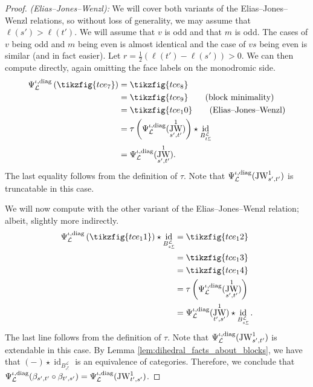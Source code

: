 \documentclass{amsart}
\newcommand{\scrL}{\mathcal{L}}
\DeclareMathOperator{\id}{id}
\DeclareMathOperator{\JW}{JW}
\theoremstyle{definition}
\numberwithin{equation}{subsection}
\begin{document}
\begin{proof}
    \emph{(Elias--Jones--Wenzl): } We will cover both variants of the Elias--Jones--Wenzl relations, so without loss of generality, we may assume that $\ell (s') > \ell (t')$.
    We will assume that $v$ is odd and that $m$ is odd. The cases of $v$ being odd and $m$ being even is almost identical and the case of $vs$ being even is similar (and in fact easier).
    Let $r = \frac{1}{2} (\ell (t') - \ell (s')) > 0$.
    We can then compute directly, again omitting the face labels on the monodromic side.
    \begin{align*}
        \Psi_{\scrL}^{\iota, \textnormal{diag}} \left( \tikzfig{tce_7}\right) &= \tikzfig{tce_8} \\
        &= \tikzfig{tce_9} \tag{block minimality}\\
        &= \tikzfig{tce_10} \tag{Elias--Jones--Wenzl}\\
        &= \tau \left(  \Psi_{\scrL}^{\iota, \textnormal{diag}} (\JW_{s',t'}^1) \right) \star \id_{B_{{}_t \underline{r}}^{\scrL}}  \\
        &= \Psi_{\scrL}^{\iota, \textnormal{diag}} (\JW_{s',t'}^1). 
    \end{align*}
    The last equality follows from the definition of $\tau$. Note that $\Psi_{\scrL}^{\iota, \textnormal{diag}} (\JW_{s',t'}^1)$ is truncatable in this case.

    We will now compute with the other variant of the Elias--Jones--Wenzl relation; albeit, slightly more indirectly.
    \begin{align*}
        \Psi_{\scrL}^{\iota, \textnormal{diag}} \left( \tikzfig{tce_11}\right) \star \id_{B_{{}_s \underline{r}}^{\scrL}} &= \tikzfig{tce_12} \\
        &= \tikzfig{tce_13} \\
        &= \tikzfig{tce_14} \\
        &= \tau \left(  \Psi_{\scrL}^{\iota, \textnormal{diag}} (\JW_{s',t'}^1) \right) \\
        &= \Psi_{\scrL}^{\iota, \textnormal{diag}} (\JW_{t',s'}^1) \star \id_{B_{{}_s \underline{r}}^{\scrL}}. 
    \end{align*}
    The last line follows from the definition of $\tau$. Note that $\Psi_{\scrL}^{\iota, \textnormal{diag}} (\JW_{s',t'}^1)$ is extendable in this case.
    By Lemma \ref{lem:dihedral_facts_about_blocks}, we have that $(-) \star \id_{B_{{}_s \underline{r}}^{\scrL}}$ is an equivalence of categories.
    Therefore, we conclude that $\Psi_{\scrL}^{\iota, \textnormal{diag}} (\beta_{s',t'} \circ \beta_{t',s'}) = \Psi_{\scrL}^{\iota, \textnormal{diag}} (\JW_{t',s'}^1)$.
\end{proof}
\end{document}
